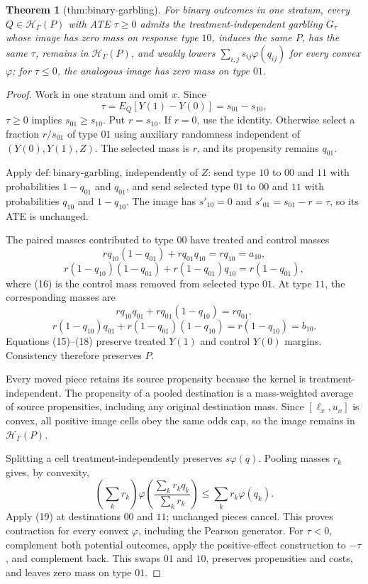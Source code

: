 \documentclass{article}
\newtheorem{theorem}{Theorem}
\begin{document}
\begin{theorem}[thm:binary-garbling]\label{thm:binary-garbling}
For binary outcomes in one stratum, every \(Q\in\mathcal H_\Gamma(P)\) with ATE \(\tau\geq0\) admits the treatment-independent garbling \(G_\tau\) whose image has zero mass on response type \(10\), induces the same \(P\), has the same \(\tau\), remains in \(\mathcal H_\Gamma(P)\), and weakly lowers \(\sum_{i,j}s_{ij}\varphi(q_{ij})\) for every convex \(\varphi\); for \(\tau\leq0\), the analogous image has zero mass on type \(01\).
\end{theorem}
\begin{proof}
Work in one stratum and omit \(x\). Since
\[
\tau=E_Q[Y(1)-Y(0)]=s_{01}-s_{10}, \tag{14}
\]
\(\tau\geq0\) implies \(s_{01}\geq s_{10}\). Put \(r=s_{10}\). If \(r=0\), use the identity. Otherwise select a fraction \(r/s_{01}\) of type \(01\) using auxiliary randomness independent of \((Y(0),Y(1),Z)\). The selected mass is \(r\), and its propensity remains \(q_{01}\).

Apply \(\mathrm{def{:}binary\mbox{-}garbling}\), independently of \(Z\): send type \(10\) to \(00\) and \(11\) with probabilities \(1-q_{01}\) and \(q_{01}\), and send selected type \(01\) to \(00\) and \(11\) with probabilities \(q_{10}\) and \(1-q_{10}\). The image has \(s'_{10}=0\) and \(s'_{01}=s_{01}-r=\tau\), so its ATE is unchanged.

The paired masses contributed to type \(00\) have treated and control masses
\[
rq_{10}(1-q_{01})+rq_{01}q_{10}=rq_{10}=a_{10}, \tag{15}
\]
\[
r(1-q_{10})(1-q_{01})+r(1-q_{01})q_{10}=r(1-q_{01}), \tag{16}
\]
where (16) is the control mass removed from selected type \(01\). At type \(11\), the corresponding masses are
\[
rq_{10}q_{01}+rq_{01}(1-q_{10})=rq_{01}, \tag{17}
\]
\[
r(1-q_{10})q_{01}+r(1-q_{01})(1-q_{10})=r(1-q_{10})=b_{10}. \tag{18}
\]
Equations (15)--(18) preserve treated \(Y(1)\) and control \(Y(0)\) margins. Consistency therefore preserves \(P\).

Every moved piece retains its source propensity because the kernel is treatment-independent. The propensity of a pooled destination is a mass-weighted average of source propensities, including any original destination mass. Since \([\ell_x,u_x]\) is convex, all positive image cells obey the same odds cap, so the image remains in \(\mathcal H_\Gamma(P)\).

Splitting a cell treatment-independently preserves \(s\varphi(q)\). Pooling masses \(r_k\) gives, by convexity,
\[
\left(\sum_kr_k\right)\varphi\left(\frac{\sum_kr_kq_k}{\sum_kr_k}\right)
\leq\sum_kr_k\varphi(q_k). \tag{19}
\]
Apply (19) at destinations \(00\) and \(11\); unchanged pieces cancel. This proves contraction for every convex \(\varphi\), including the Pearson generator. For \(\tau<0\), complement both potential outcomes, apply the positive-effect construction to \(-\tau\), and complement back. This swaps \(01\) and \(10\), preserves propensities and costs, and leaves zero mass on type \(01\).
\end{proof}
\end{document}
